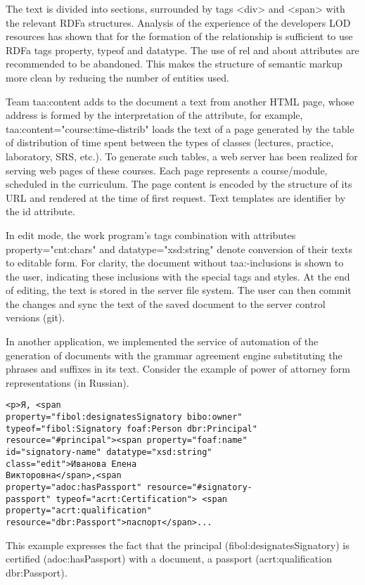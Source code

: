\documentclass[conference,a4paper]{IEEEtran}
\begin{document}
The text is divided into sections, surrounded by tags
<div> and <span> with the
relevant RDFa structures. Analysis of the experience of the developers
LOD resources has shown that for the formation of the relationship is
sufficient to use RDFa tags property, typeof and datatype. The use of
rel and about attributes are recommended to be abandoned. This makes the
structure of semantic markup more clean by reducing the number of
entities used.

Team taa:content adds to the document a text from another HTML page,
whose address is formed by the interpretation of the attribute, for
example, taa:content="course:time-distrib" loads the text of a page
generated by the table of distribution of time spent between the types
of classes (lectures, practice, laboratory, SRS, etc.). To generate such
tables, a web server has been realized for serving web pages of these
courses. Each page represents a course/module, scheduled in the
curriculum. The page content is encoded by the structure of its URL and
rendered at the time of first request. Text templates are identifier by
the id attribute.

In edit mode, the work program's tags combination with attributes
property="cnt:chars" and datatype="xsd:string" denote conversion of
their texts to editable form. For clarity, the document without
taa:-inclusions is shown to the user, indicating these inclusions with
the special tags and styles. At the end of editing, the text is stored
in the server file system. The user can then commit the changes and sync
the text of the saved document to the server control versions (git).

In another application, we implemented the service of automation of the
generation of documents with the grammar agreement engine substituting
the phrases and suffixes in its text. Consider the example of power of
attorney form representations (in Russian).

\begin{verbatim}
<p>Я, <span
property="fibol:designatesSignatory bibo:owner"
typeof="fibol:Signatory foaf:Person dbr:Principal"
resource="#principal"><span property="foaf:name"
id="signatory-name" datatype="xsd:string"
class="edit">Иванова Елена
Викторовна</span>,<span
property="adoc:hasPassport" resource="#signatory-
passport" typeof="acrt:Certification"> <span
property="acrt:qualification"
resource="dbr:Passport">паспорт</span>...
\end{verbatim}

This example expresses the fact that the principal
(fibol:designates\-Signatory) is certified (adoc:hasPassport) with a
document, a passport (acrt:qualification dbr:Passport).
\end{document}
